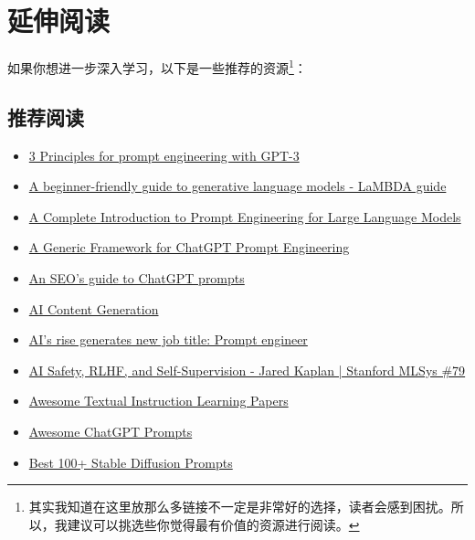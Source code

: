 \chapter{延伸阅读}
\label{ch:extended-reading}

如果你想进一步深入学习，以下是一些推荐的资源\footnote{其实我知道在这里放那么多链接不一定是非常好的选择，读者会感到困扰。所以，我建议可以挑选些你觉得最有价值的资源进行阅读。}：

\section{推荐阅读}

\begin{itemize}
  \item \href{https://www.linkedin.com/pulse/3-principles-prompt-engineering-gpt-3-ben-whately}{3 Principles for prompt engineering with GPT-3}
  \item \href{https://aitestkitchen.withgoogle.com/how-lamda-works}{A beginner-friendly guide to generative language models - LaMBDA guide}
  \item \href{https://www.mihaileric.com/posts/a-complete-introduction-to-prompt-engineering}{A Complete Introduction to Prompt Engineering for Large Language Models}
  \item \href{https://medium.com/@thorbjoern.heise/a-generic-framework-for-chatgpt-prompt-engineering-7097f6513a0b}{A Generic Framework for ChatGPT Prompt Engineering}
  \item \href{https://searchengineland.com/chatgpt-prompts-seo-393523}{An SEO’s guide to ChatGPT prompts}
  \item \href{https://www.jonstokes.com/p/ai-content-generation-part-1-machine}{AI Content Generation}
  \item \href{https://www.axios.com/2023/02/22/chatgpt-prompt-engineers-ai-job}{AI's rise generates new job title: Prompt engineer}
  \item \href{https://www.youtube.com/watch?v=fqC3D-zNJUM&ab_channel=StanfordMLSysSeminars}{AI Safety, RLHF, and Self-Supervision - Jared Kaplan | Stanford MLSys \#79}
  \item \href{https://github.com/RenzeLou/awesome-instruction-learning}{Awesome Textual Instruction Learning Papers}
  \item \href{https://github.com/f/awesome-chatgpt-prompts}{Awesome ChatGPT Prompts}
  \item \href{https://mpost.io/best-100-stable-diffusion-prompts-the-most-beautiful-ai-text-to-image-prompts}{Best 100+ Stable Diffusion Prompts}

\end{itemize}
